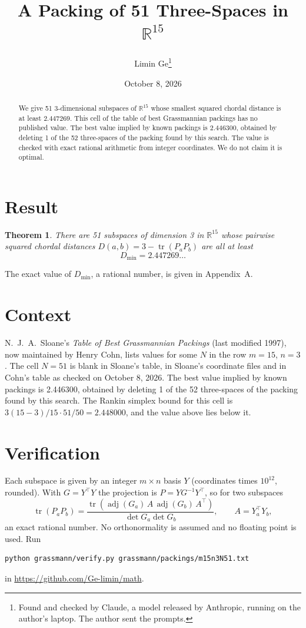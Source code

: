 \documentclass[11pt,a4paper]{article}
\title{A Packing of 51 Three-Spaces in $\mathbb{R}^{15}$}
\author{Limin Ge\thanks{Found and checked by Claude, a model released by Anthropic, running on the author's laptop. The author sent the prompts.}}
\date{October 8, 2026}
\newtheorem*{theorem}{Theorem}
\begin{document}
\maketitle
\begin{abstract}
We give 51 3-dimensional subspaces of $\mathbb{R}^{15}$ whose smallest squared chordal distance is at least 2.447269. This cell of the table of best Grassmannian packings has no published value. The best value implied by known packings is 2.446300, obtained by deleting 1 of the 52 three-spaces of the packing found by this search. The value is checked with exact rational arithmetic from integer coordinates. We do not claim it is optimal.
\end{abstract}

\section{Result}
\begin{theorem}
There are 51 subspaces of dimension 3 in $\mathbb{R}^{15}$ whose pairwise squared chordal distances $D(a,b) = 3 - \operatorname{tr}(P_aP_b)$ are all at least
\[ D_{\min} = 2.447269\ldots \]
\end{theorem}
The exact value of $D_{\min}$, a rational number, is given in Appendix~A.


\section{Context}
N.~J.~A.~Sloane's \emph{Table of Best Grassmannian Packings} (last modified 1997), now maintained by Henry Cohn, lists values for some $N$ in the row $m=15$, $n=3$. The cell $N=51$ is blank in Sloane's table, in Sloane's coordinate files and in Cohn's table as checked on October 8, 2026. The best value implied by known packings is 2.446300, obtained by deleting 1 of the 52 three-spaces of the packing found by this search. The Rankin simplex bound for this cell is $3(15-3)/15\cdot 51/50 = 2.448000$, and the value above lies below it.


\section{Verification}
Each subspace is given by an integer $m\times n$ basis $Y$ (coordinates times $10^{12}$, rounded). With $G=Y^\top Y$ the projection is $P=YG^{-1}Y^\top$, so for two subspaces
\[ \operatorname{tr}(P_aP_b)=\frac{\operatorname{tr}(\operatorname{adj}(G_a)\,A\,\operatorname{adj}(G_b)\,A^\top)}{\det G_a\det G_b},\qquad A=Y_a^\top Y_b, \]
an exact rational number. No orthonormality is assumed and no floating point is used. Run
\begin{verbatim}
python grassmann/verify.py grassmann/packings/m15n3N51.txt
\end{verbatim}
in \url{https://github.com/Ge-limin/math}.
\end{document}
